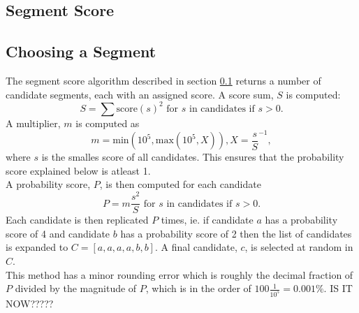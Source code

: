 \subsection{Segment Score}\label{sec:segment_score}
%

%
\subsection{Choosing a Segment}
%
The segment score algorithm described in section \ref{sec:segment_score} returns a number of candidate segments, each with an assigned score. A score sum, $S$ is computed:
\[
S = \sum{\text{score}(s)^2 \text{ for } s \text{ in candidates if } s > 0}.
\]
A multiplier, $m$ is computed as
\[
m = \text{min}(10^5, \text{max}(10^5, X)), X = \frac{s}{S}^{-1},
\] %
where $s$ is the smalles score of all candidates. This ensures that the probability score explained below is atleast 1.\\
A probability score, $P$, is then computed for each candidate 
\[
P = m \frac{s^2}{S} \text{ for } s \text{ in candidates if } s > 0.
\] %
Each candidate is then replicated $P$ times, ie. if candidate $a$ has a probability score of 4 and candidate $b$ has a probability score of 2 then the list of candidates is expanded to $C = [a,a,a,a,b,b]$. A final candidate, $c$, is selected at random in $C$.\\
This method has a minor rounding error which is roughly the decimal fraction of $P$ divided by the magnitude of $P$, which is in the order of $100\frac{1}{10^5} = 0.001\%$. IS IT NOW?????
%
